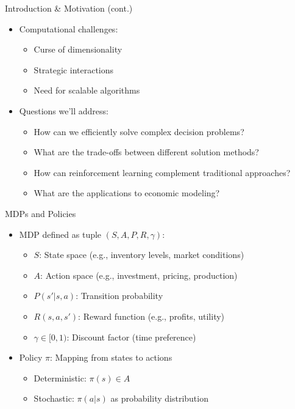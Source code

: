 \documentclass[10pt]{beamer}
\begin{document}
\begin{frame}{Introduction \& Motivation (cont.)}
    \begin{itemize}
        \item Computational challenges:
        \begin{itemize}
            \item Curse of dimensionality
            \item Strategic interactions
            \item Need for scalable algorithms
        \end{itemize}
        \vspace{0.2cm}
        \item Questions we'll address:
        \begin{itemize}
            \item How can we efficiently solve complex decision problems?
            \item What are the trade-offs between different solution methods?
            \item How can reinforcement learning complement traditional approaches?
            \item What are the applications to economic modeling?
        \end{itemize}
    \end{itemize}
\end{frame}


\begin{frame}{MDPs and Policies}
    \begin{itemize}
        \item MDP defined as tuple $(S, A, P, R, \gamma)$:
        \begin{itemize}
            \item $S$: State space (e.g., inventory levels, market conditions)
            \item $A$: Action space (e.g., investment, pricing, production)
            \item $P(s'|s,a)$: Transition probability
            \item $R(s,a,s')$: Reward function (e.g., profits, utility)
            \item $\gamma \in [0,1)$: Discount factor (time preference)
        \end{itemize}
        \vspace{0.2cm}
        \item Policy $\pi$: Mapping from states to actions
        \begin{itemize}
            \item Deterministic: $\pi(s) \in A$
            \item Stochastic: $\pi(a|s)$ as probability distribution
        \end{itemize}
    \end{itemize}
\end{frame}
\end{document}
